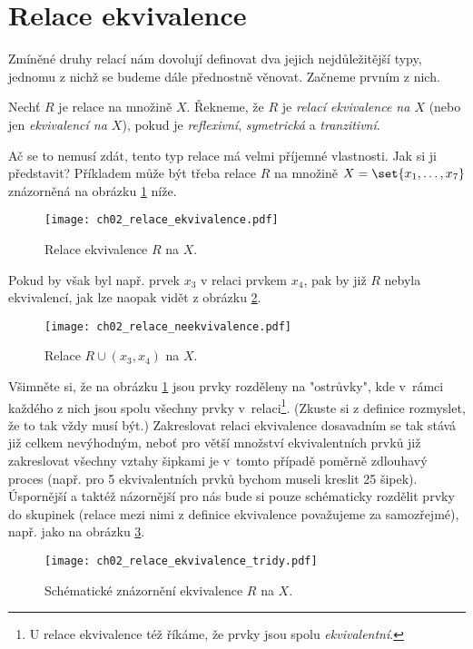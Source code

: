 \section{Relace ekvivalence}\label{sec:relace_ekvivalence}
Zmíněné druhy relací nám dovolují definovat dva jejich nejdůležitější typy, jednomu z nichž se budeme dále přednostně věnovat. Začneme prvním z nich.
\begin{definition}\label{def:relace_ekvivalence}
    Nechť $R$ je relace na množině $X$. Řekneme, že $R$ je \emph{relací ekvivalence na $X$} (nebo jen \emph{ekvivalencí na $X$}), pokud je \emph{reflexivní}, \emph{symetrická} a \emph{tranzitivní}.
\end{definition}
Ač se to nemusí zdát, tento typ relace má velmi příjemné vlastnosti. Jak si ji představit? Příkladem může být třeba relace $R$ na množině $X=\set{x_1,\dots,x_7}$ znázorněná na obrázku \ref{fig:priklad_relace_ekvivalence} níže.
\begin{figure}[H]
    \centering
    \texttt{[image: ch02\_relace\_ekvivalence.pdf]}
    \caption{Relace ekvivalence $R$ na $X$.}
    \label{fig:priklad_relace_ekvivalence}
\end{figure}
Pokud by však byl např. prvek $x_3$ v relaci prvkem $x_4$, pak by již $R$ nebyla ekvivalencí, jak lze naopak vidět z obrázku \ref{fig:priklad_relace_neekvivalence}.
\begin{figure}[H]
    \centering
    \texttt{[image: ch02\_relace\_neekvivalence.pdf]}
    \caption{Relace $R \cup (x_3,x_4)$ na $X$.}
    \label{fig:priklad_relace_neekvivalence}
\end{figure}
Všimněte si, že na obrázku \ref{fig:priklad_relace_ekvivalence} jsou prvky rozděleny na "ostrůvky", kde v~rámci každého z nich jsou spolu všechny prvky v~relaci\footnote{U relace ekvivalence též říkáme, že prvky jsou spolu \emph{ekvivalentní}.}. (Zkuste si z definice rozmyslet, že to tak vždy musí být.) Zakreslovat relaci ekvivalence dosavadním se tak stává již celkem nevýhodným, neboť pro větší množství ekvivalentních prvků již zakreslovat všechny vztahy šipkami je v~tomto případě poměrně zdlouhavý proces (např. pro 5 ekvivalentních prvků bychom museli kreslit 25 šipek). Úspornější a taktéž názornější pro nás bude si pouze schématicky rozdělit prvky do skupinek (relace mezi nimi z definice ekvivalence považujeme za samozřejmé), např. jako na obrázku \ref{fig:relace_ekvivalence_tridy}.
\begin{figure}[H]
    \centering
    \texttt{[image: ch02\_relace\_ekvivalence\_tridy.pdf]}
    \caption{Schématické znázornění ekvivalence $R$ na $X$.}
    \label{fig:relace_ekvivalence_tridy}
\end{figure}
